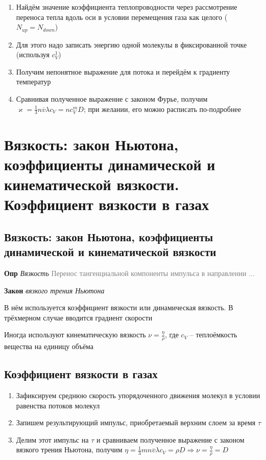 \documentclass[a4paper, 14pt]{article}
\begin{document}
    \begin{enumerate}
        \item Найдём значение коэффициента теплопроводности через рассмотрение переноса тепла вдоль оси в условии
        перемещения газа как целого ($N_{up} = N_{down}$)
        \item Для этого надо записать энергию одной молекулы в фиксированной точке (используя $c^1_V$)
        \item Получим непонятное выражение для потока и перейдём к градиенту температур
        \item Сравнивая полученное выражение с законом Фурье, получим $\varkappa = \frac{1}{3} n \overline{v} \lambda
        c_V = n c^m_V D$; при желании, его можно расписать по-подробнее
    \end{enumerate}

    \section{Вязкость: закон Ньютона, коэффициенты динамической и кинематической вязкости.
    Коэффициент вязкости в газах}

    \subsection{Вязкость: закон Ньютона, коэффициенты динамической и кинематической вязкости}

    \textbf{Опр} \textit{Вязкость} \textcolor{gray}{Перенос тангенциальной компоненты импульса в направлении ...}

    \textbf{Закон} \textit{вязкого трения Ньютона}

    В нём используется коэффициент вязкости или динамическая вязкость.
    В трёхмерном случае вводится градиент скорости

    Иногда используют кинематическую вязкость $\nu = \frac{\eta}{\rho}$, где $c_V$ -- теплоёмкость вещества на
    единицу объёма

    \subsection{Коэффициент вязкости в газах}

    \begin{enumerate}
        \item Зафиксируем среднюю скорость упорядоченного движения молекул в условии равенства потоков молекул
        \item Запишем результирующий импульс, приобретаемый верхним слоем за время $\tau$
        \item Делим этот импульс на $\tau$ и сравниваем полученное выражение с законом вязкого трения Ньютона,
        получим $\eta = \frac{1}{3} mn \overline{v} \lambda c_V = \rho D \Rightarrow \nu = \frac{\eta}{\rho} = D$
    \end{enumerate}
\end{document}
